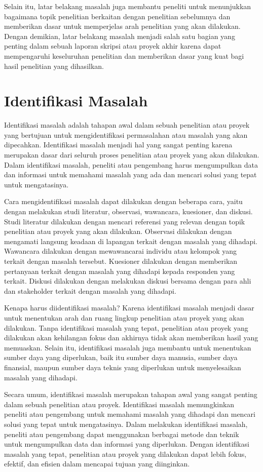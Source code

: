 Selain itu, latar belakang masalah juga membantu peneliti untuk menunjukkan bagaimana topik penelitian berkaitan dengan penelitian sebelumnya dan memberikan dasar untuk memperjelas arah penelitian yang akan dilakukan. Dengan demikian, latar belakang masalah menjadi salah satu bagian yang penting dalam sebuah laporan skripsi atau proyek akhir karena dapat mempengaruhi keseluruhan penelitian dan memberikan dasar yang kuat bagi hasil penelitian yang dihasilkan.


\section{Identifikasi Masalah}
Identifikasi masalah adalah tahapan awal dalam sebuah penelitian atau proyek yang bertujuan untuk mengidentifikasi permasalahan atau masalah yang akan dipecahkan. Identifikasi masalah menjadi hal yang sangat penting karena merupakan dasar dari seluruh proses penelitian atau proyek yang akan dilakukan. Dalam identifikasi masalah, peneliti atau pengembang harus mengumpulkan data dan informasi untuk memahami masalah yang ada dan mencari solusi yang tepat untuk mengatasinya.

Cara mengidentifikasi masalah dapat dilakukan dengan beberapa cara, yaitu dengan melakukan studi literatur, observasi, wawancara, kuesioner, dan diskusi. Studi literatur dilakukan dengan mencari referensi yang relevan dengan topik penelitian atau proyek yang akan dilakukan. Observasi dilakukan dengan mengamati langsung keadaan di lapangan terkait dengan masalah yang dihadapi. Wawancara dilakukan dengan mewawancarai individu atau kelompok yang terkait dengan masalah tersebut. Kuesioner dilakukan dengan memberikan pertanyaan terkait dengan masalah yang dihadapi kepada responden yang terkait. Diskusi dilakukan dengan melakukan diskusi bersama dengan para ahli dan stakeholder terkait dengan masalah yang dihadapi.

Kenapa harus diidentifikasi masalah? Karena identifikasi masalah menjadi dasar untuk menentukan arah dan ruang lingkup penelitian atau proyek yang akan dilakukan. Tanpa identifikasi masalah yang tepat, penelitian atau proyek yang dilakukan akan kehilangan fokus dan akhirnya tidak akan memberikan hasil yang memuaskan. Selain itu, identifikasi masalah juga membantu untuk menentukan sumber daya yang diperlukan, baik itu sumber daya manusia, sumber daya finansial, maupun sumber daya teknis yang diperlukan untuk menyelesaikan masalah yang dihadapi.

Secara umum, identifikasi masalah merupakan tahapan awal yang sangat penting dalam sebuah penelitian atau proyek. Identifikasi masalah memungkinkan peneliti atau pengembang untuk memahami masalah yang dihadapi dan mencari solusi yang tepat untuk mengatasinya. Dalam melakukan identifikasi masalah, peneliti atau pengembang dapat menggunakan berbagai metode dan teknik untuk mengumpulkan data dan informasi yang diperlukan. Dengan identifikasi masalah yang tepat, penelitian atau proyek yang dilakukan dapat lebih fokus, efektif, dan efisien dalam mencapai tujuan yang diinginkan.

